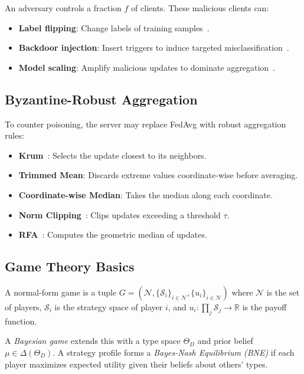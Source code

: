 \documentclass{article}
\newcommand{\ThetaD}{\Theta_D}
\begin{document}
An adversary controls a fraction $f$ of clients. These malicious clients can:
\begin{itemize}
    \item \textbf{Label flipping}: Change labels of training samples~\citep{chen2017targeted}.
    \item \textbf{Backdoor injection}: Insert triggers to induce targeted misclassification~\citep{bagdasaryan2020backdoor,xie2019dba}.
    \item \textbf{Model scaling}: Amplify malicious updates to dominate aggregation~\citep{bagdasaryan2020backdoor}.
\end{itemize}

\subsection{Byzantine-Robust Aggregation}

To counter poisoning, the server may replace FedAvg with robust aggregation rules:
\begin{itemize}
    \item \textbf{Krum}~\citep{blanchard2017machine}: Selects the update closest to its neighbors.
    \item \textbf{Trimmed Mean}: Discards extreme values coordinate-wise before averaging.
    \item \textbf{Coordinate-wise Median}: Takes the median along each coordinate.
    \item \textbf{Norm Clipping}~\citep{sun2019can}: Clips updates exceeding a threshold $\tau$.
    \item \textbf{RFA}~\citep{pillutla2019robust}: Computes the geometric median of updates.
\end{itemize}

\subsection{Game Theory Basics}

A normal-form game is a tuple $G = (\mathcal{N}, \{\mathcal{S}_i\}_{i \in \mathcal{N}}, \{u_i\}_{i \in \mathcal{N}})$ where $\mathcal{N}$ is the set of players, $\mathcal{S}_i$ is the strategy space of player $i$, and $u_i: \prod_j \mathcal{S}_j \to \mathbb{R}$ is the payoff function.

A \emph{Bayesian game} extends this with a type space $\ThetaD$ and prior belief $\mu \in \Delta(\ThetaD)$. A strategy profile forms a \emph{Bayes-Nash Equilibrium (BNE)} if each player maximizes expected utility given their beliefs about others' types.
\end{document}
